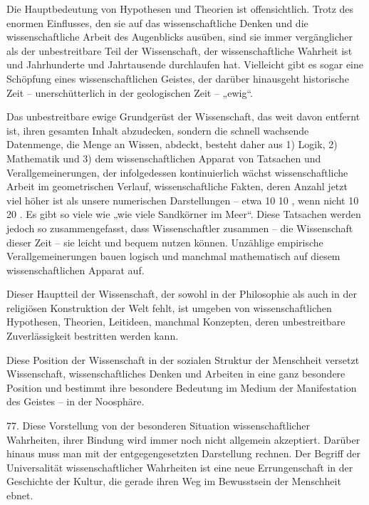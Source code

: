 \documentclass[11pt,a4paper]{book}
\begin{document}
Die Hauptbedeutung von Hypothesen und Theorien ist offensichtlich. Trotz des enormen Einflusses, den sie auf das wissenschaftliche Denken und die wissenschaftliche Arbeit des Augenblicks ausüben, sind sie immer vergänglicher als der unbestreitbare Teil der Wissenschaft, der wissenschaftliche Wahrheit ist und Jahrhunderte und Jahrtausende durchlaufen hat. Vielleicht gibt es sogar eine Schöpfung eines wissenschaftlichen Geistes, der darüber hinausgeht historische Zeit -- unerschütterlich in der geologischen Zeit -- „ewig“.



Das unbestreitbare ewige Grundgerüst der Wissenschaft, das weit davon entfernt ist, ihren gesamten Inhalt abzudecken, sondern die schnell wachsende Datenmenge, die Menge an Wissen, abdeckt, besteht daher aus 1) Logik, 2) Mathematik und 3) dem wissenschaftlichen Apparat von Tatsachen und Verallgemeinerungen, der infolgedessen kontinuierlich wächst wissenschaftliche Arbeit im geometrischen Verlauf, wissenschaftliche Fakten, deren Anzahl jetzt viel höher ist als unsere numerischen Darstellungen -- etwa 10 10 , wenn nicht 10 20 . Es gibt so viele wie „wie viele Sandkörner im Meer“. Diese Tatsachen werden jedoch so zusammengefasst, dass Wissenschaftler zusammen -- die Wissenschaft dieser Zeit -- sie leicht und bequem nutzen können. Unzählige empirische Verallgemeinerungen bauen logisch und manchmal mathematisch auf diesem wissenschaftlichen Apparat auf.



Dieser Hauptteil der Wissenschaft, der sowohl in der Philosophie als auch in der religiösen Konstruktion der Welt fehlt, ist umgeben von wissenschaftlichen Hypothesen, Theorien, Leitideen, manchmal Konzepten, deren unbestreitbare Zuverlässigkeit bestritten werden kann.



Diese Position der Wissenschaft in der sozialen Struktur der Menschheit versetzt Wissenschaft, wissenschaftliches Denken und Arbeiten in eine ganz besondere Position und bestimmt ihre besondere Bedeutung im Medium der Manifestation des Geistes -- in der Noosphäre.



77. Diese Vorstellung von der besonderen Situation wissenschaftlicher Wahrheiten, ihrer Bindung wird immer noch nicht allgemein akzeptiert. Darüber hinaus muss man mit der entgegengesetzten Darstellung rechnen. Der Begriff der Universalität wissenschaftlicher Wahrheiten ist eine neue Errungenschaft in der Geschichte der Kultur, die gerade ihren Weg im Bewusstsein der Menschheit ebnet.
\end{document}

